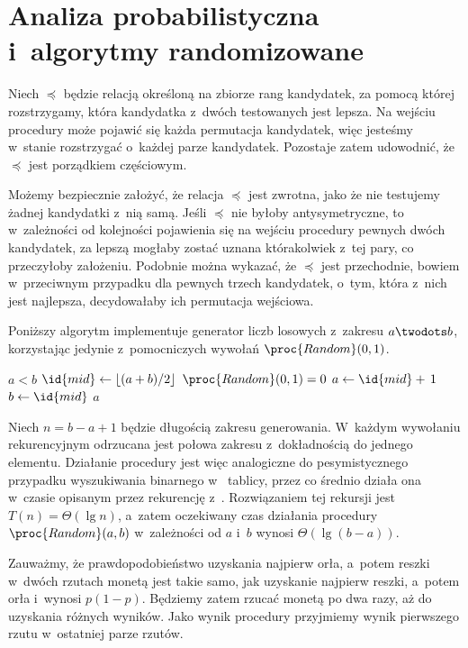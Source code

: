 \chapter{Analiza probabilistyczna i~algorytmy randomizowane}


\exercise %
Niech $\preceq$ będzie relacją określoną na zbiorze rang kandydatek, za pomocą której rozstrzygamy, która kandydatka z~dwóch testowanych jest lepsza. Na wejściu procedury  może pojawić się każda permutacja kandydatek, więc jesteśmy w~stanie rozstrzygać o~każdej parze kandydatek. Pozostaje zatem udowodnić, że $\preceq$ jest porządkiem częściowym.

Możemy bezpiecznie założyć, że relacja $\preceq$ jest zwrotna, jako że nie testujemy żadnej kandydatki z~nią samą. Jeśli $\preceq$ nie byłoby antysymetryczne, to w~zależności od kolejności pojawienia się na wejściu procedury pewnych dwóch kandydatek, za lepszą mogłaby zostać uznana którakolwiek z~tej pary, co przeczyłoby założeniu. Podobnie można wykazać, że $\preceq$ jest przechodnie, bowiem w~przeciwnym przypadku dla pewnych trzech kandydatek, o~tym, która z~nich jest najlepsza, decydowałaby ich permutacja wejściowa.

\exercise %
Poniższy algorytm implementuje generator liczb losowych z~zakresu $a\twodots b$, korzystając jedynie z~pomocniczych wywołań $\proc{Random}(0,1)$.
\begin{codebox}
\li	\While $a<b$
\li		\Do
			$\id{mid}\gets\lfloor(a+b)/2\rfloor$
\li			\If $\proc{Random}(0,1)=0$
\li				\Then $a\gets\id{mid}+\,1$
\li				\Else $b\gets\id{mid}$
				\End
		\End
\li	\Return $a$
\end{codebox}

Niech $n=b-a+1$ będzie długością zakresu generowania. W~każdym wywołaniu rekurencyjnym odrzucana jest połowa zakresu z~dokładnością do jednego elementu. Działanie procedury jest więc analogiczne do pesymistycznego przypadku wyszukiwania binarnego w~ tablicy, przez co średnio działa ona w~czasie opisanym przez rekurencję z~. Rozwiązaniem tej rekursji jest $T(n)=\Theta(\lg n)$, a~zatem oczekiwany czas działania procedury $\proc{Random}(a,b)$ w~zależności od $a$ i~$b$ wynosi $\Theta(\lg(b-a))$.

\exercise %
Zauważmy, że prawdopodobieństwo uzyskania najpierw orła, a~potem reszki w~dwóch rzutach monetą jest takie samo, jak uzyskanie najpierw reszki, a~potem orła i~wynosi $p(1-p)$. Będziemy zatem rzucać monetą po dwa razy, aż do uzyskania różnych wyników. Jako wynik procedury przyjmiemy wynik pierwszego rzutu w~ostatniej parze rzutów.

